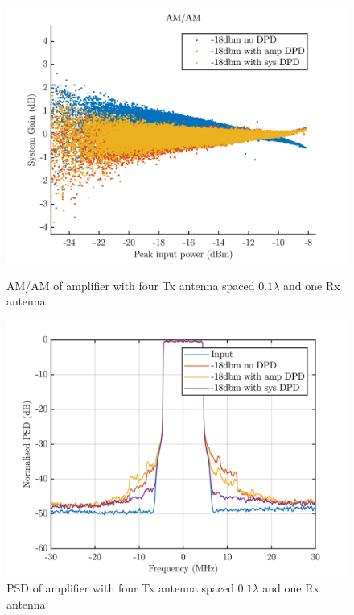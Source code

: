 \begin{figure}[H]
  \centering
  \begin{minipage}[b]{0.5\textwidth}
	\includegraphics[scale = 0.5]{figures/measurement/cree/four/amam_four_ant_0p1.png}
	\caption{AM/AM of amplifier with four Tx antenna spaced $0.1\lambda$ and one Rx antenna}
    \label{fig:cree_amam_one_ant}
  \end{minipage}
  \hfill
  \begin{minipage}[b]{0.4\textwidth}
\includegraphics[scale = 0.5]{figures/measurement/cree/four/psd_four_ant_0p1.png}
\caption{PSD of amplifier with four Tx antenna spaced $0.1\lambda$ and one Rx antenna}
    \label{fig:cree_psd_one_ant}
  \end{minipage}
\end{figure}

